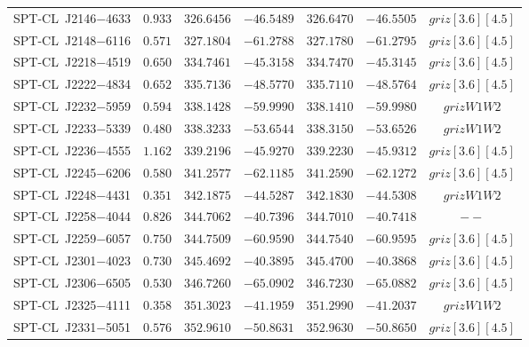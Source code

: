 \begin{table}
{\begin{tabular}{ccccccc}
    SPT-CL~J2146$-$4633    &$ 0.933 $    &$ 326.6456 $    &$ -46.5489 $     &$ 326.6470 $    &$ -46.5505 $     & $griz[3.6][4.5]$    \\ 
    SPT-CL~J2148$-$6116    &$ 0.571 $    &$ 327.1804 $    &$ -61.2788 $     &$ 327.1780 $    &$ -61.2795 $     & $griz[3.6][4.5]$    \\ 
    SPT-CL~J2218$-$4519    &$ 0.650 $    &$ 334.7461 $    &$ -45.3158 $     &$ 334.7470 $    &$ -45.3145 $     & $griz[3.6][4.5]$    \\ 
    SPT-CL~J2222$-$4834    &$ 0.652 $    &$ 335.7136 $    &$ -48.5770 $     &$ 335.7110 $    &$ -48.5764 $     & $griz[3.6][4.5]$    \\ 
    SPT-CL~J2232$-$5959    &$ 0.594 $    &$ 338.1428 $    &$ -59.9990 $     &$ 338.1410 $    &$ -59.9980 $     & $grizW1W2$    \\ 
    SPT-CL~J2233$-$5339    &$ 0.480 $    &$ 338.3233 $    &$ -53.6544 $     &$ 338.3150 $    &$ -53.6526 $     & $grizW1W2$    \\ 
    SPT-CL~J2236$-$4555    &$ 1.162 $    &$ 339.2196 $    &$ -45.9270 $     &$ 339.2230 $    &$ -45.9312 $     & $griz[3.6][4.5]$    \\ 
    SPT-CL~J2245$-$6206    &$ 0.580 $    &$ 341.2577 $    &$ -62.1185 $     &$ 341.2590 $    &$ -62.1272 $     & $griz[3.6][4.5]$    \\ 
    SPT-CL~J2248$-$4431    &$ 0.351 $    &$ 342.1875 $    &$ -44.5287 $     &$ 342.1830 $    &$ -44.5308 $     & $grizW1W2$    \\ 
    SPT-CL~J2258$-$4044    &$ 0.826 $    &$ 344.7062 $    &$ -40.7396 $     &$ 344.7010 $    &$ -40.7418 $     & $--$    \\ 
    SPT-CL~J2259$-$6057    &$ 0.750 $    &$ 344.7509 $    &$ -60.9590 $     &$ 344.7540 $    &$ -60.9595 $     & $griz[3.6][4.5]$    \\ 
    SPT-CL~J2301$-$4023    &$ 0.730 $    &$ 345.4692 $    &$ -40.3895 $     &$ 345.4700 $    &$ -40.3868 $     & $griz[3.6][4.5]$    \\ 
    SPT-CL~J2306$-$6505    &$ 0.530 $    &$ 346.7260 $    &$ -65.0902 $     &$ 346.7230 $    &$ -65.0882 $     & $griz[3.6][4.5]$    \\ 
    SPT-CL~J2325$-$4111    &$ 0.358 $    &$ 351.3023 $    &$ -41.1959 $     &$ 351.2990 $    &$ -41.2037 $     & $grizW1W2$    \\ 
    SPT-CL~J2331$-$5051    &$ 0.576 $    &$ 352.9610 $    &$ -50.8631 $     &$ 352.9630 $    &$ -50.8650 $     & $griz[3.6][4.5]$    \\ 

\end{tabular}}
\end{table}
